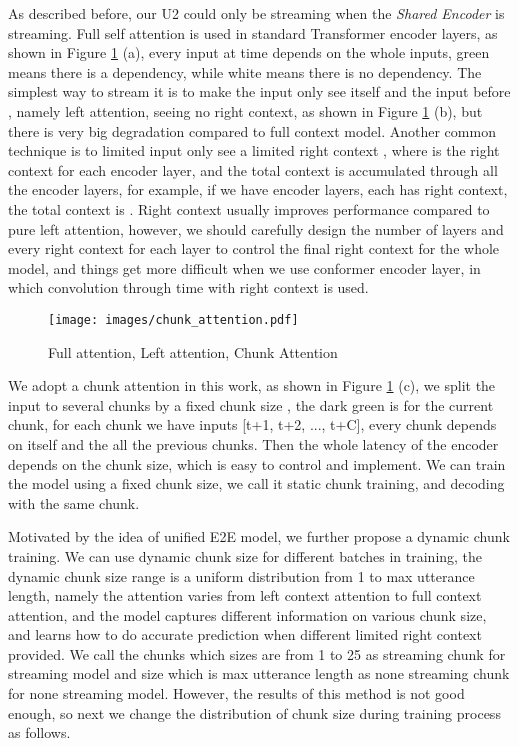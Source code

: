 \documentclass[a4paper]{article}
\begin{document}
As described before, our U2 could only be streaming when the \textit{Shared Encoder} is streaming. Full self attention is used in standard Transformer encoder layers, as shown in Figure \ref{fig:chunk_attention} (a), every input at time  depends on the whole inputs, green means there is a dependency, while white means there is no dependency.
The simplest way to stream it is to make the input  only see itself and the input before , namely left attention, seeing no right context, as shown in Figure \ref{fig:chunk_attention} (b), but there is very big degradation compared to full context model.
Another common technique is to limited input  only see a limited right context {}, where  is the right context for each encoder layer, and the total context is accumulated through all the encoder layers, for example, if we have  encoder layers, each has  right context, the total context is . Right context usually improves performance compared to pure left attention, however, we should carefully design the number of layers and every right context for each layer to control the final right context for the whole model, and things get more difficult when we use conformer encoder layer, in which convolution through time with right context is used.
\begin{figure}[h]
  \centering
  \texttt{[image: images/chunk\_attention.pdf]}
  \caption{Full attention, Left attention, Chunk Attention}
  \label{fig:chunk_attention}
  \vspace{-1.0em}
\end{figure}
We adopt a chunk attention in this work, as shown in Figure \ref{fig:chunk_attention} (c), we split the input to several chunks by a fixed chunk size , the dark green is for the current chunk, for each chunk we have inputs [t+1, t+2, ..., t+C], every chunk depends on itself and the all the previous chunks. Then the whole latency of the encoder depends on the chunk size, which is easy to control and implement. We can train the model using a fixed chunk size, we call it static chunk training, and decoding with the same chunk.

Motivated by the idea of unified E2E model, we further propose a dynamic chunk training. We can use dynamic chunk size for different batches in training, the dynamic chunk size range is a uniform distribution from 1 to max utterance length, namely the attention varies from left context attention to full context attention, and the model captures different information on various chunk size, and learns how to do accurate prediction when different limited right context provided. We call the chunks which sizes are from 1 to 25 as streaming chunk for streaming model and size which is max utterance length as none streaming chunk for none streaming model. However, the results of this method is not good enough, so next we change the distribution of chunk size during training process as follows.
\end{document}

